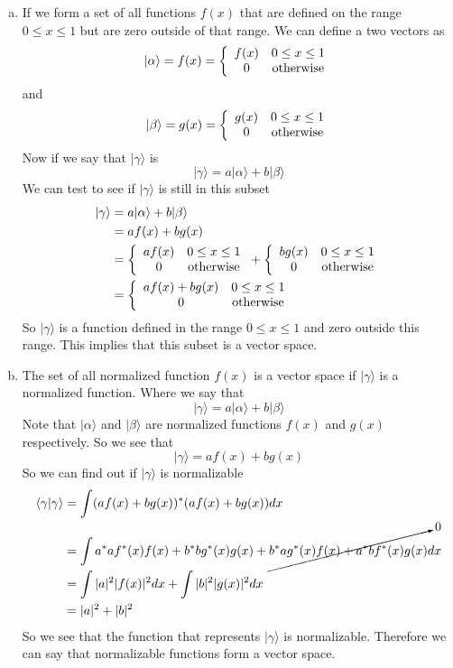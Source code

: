 \documentclass[11pt]{article}
\numberwithin{equation}{section}
\newcommand{\vect}[1]{|{#1}\rangle}
\begin{document}
\begin{enumerate}[(a)]
\item
If we form a set of all functions $f(x)$ that are defined on the range $0\le x\le 1$ but are zero outside of that range. We can define a two vectors as 
$$\vect{\alpha} = f(x) = \left\{\begin{array}{cc}
	f(x)	&0\le x\le 1\\
	0	&\textnormal{otherwise}
	\end{array}\right.$$
and
$$\vect{\beta} = g(x) = \left\{\begin{array}{cc}
	g(x)	&0\le x\le 1\\
	0	&\textnormal{otherwise}
	\end{array}\right.$$
Now if we say that $\vect{\gamma}$ is
$$\vect{\gamma} = a\vect{\alpha} +b\vect{\beta}$$
We can test to see if $\vect{\gamma}$ is still in this subset
\begin{align*}
\vect{\gamma} &= a\vect{\alpha} +b\vect{\beta}\\
&= af(x) + bg(x)\\
&= \left\{\begin{array}{cc}
	af(x)	&0\le x\le 1\\
	0	&\textnormal{otherwise}
	\end{array}\right.+
\left\{\begin{array}{cc}
	bg(x)	&0\le x\le 1\\
	0	&\textnormal{otherwise}
	\end{array}\right.\\
&= \left\{\begin{array}{cc}
	af(x)+bg(x)	&0\le x\le 1\\
	0	&\textnormal{otherwise}
	\end{array}\right.
\end{align*}
So $\vect{\gamma}$ is a function defined in the range $0\le x\le 1$ and zero outside this range. This implies that this subset is a vector space.

\item
The set of all normalized function $f(x)$ is a vector space if $\vect{\gamma}$ is a normalized function. Where we say that
$$\vect{\gamma} = a\vect{\alpha} + b\vect{\beta}$$
Note that $\vect{\alpha}$ and $\vect{\beta}$ are normalized functions $f(x)$ and $g(x)$ respectively. So we see that
$$\vect{\gamma} = af(x)+bg(x)$$
So we can find out if $\vect{\gamma}$ is normalizable 
\begin{align*}
\langle\gamma|\gamma\rangle &= \int (af(x)+bg(x))^*(af(x)+bg(x))dx\\
&= \int a^*af^*(x)f(x)+b^*bg^*(x)g(x)+\cancelto{0}{b^*ag^*(x)f(x)+a^*bf^*(x)g(x)}dx\\
&= \int |a|^2|f(x)|^2dx + \int|b|^2|g(x)|^2dx\\
&= |a|^2 + |b|^2
\end{align*}
So we see that the function that represents $\vect{\gamma}$ is normalizable. Therefore we can say that normalizable functions form a vector space.
\end{enumerate}
\end{document}
